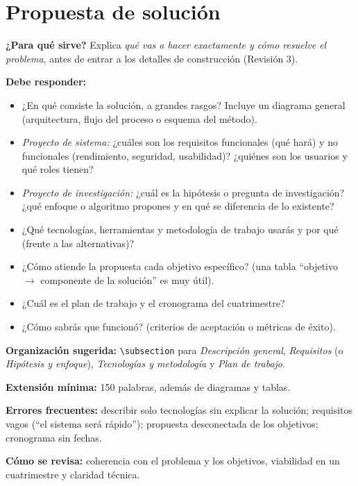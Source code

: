 
\section{Propuesta de solución} \label{sec:propuesta} %

\begin{guia}
\textbf{¿Para qué sirve?} Explica \emph{qué vas a hacer exactamente y cómo resuelve el problema}, antes de entrar a los
detalles de construcción (Revisión 3).

\textbf{Debe responder:}
\begin{itemize}[nosep,leftmargin=*]
  \item ¿En qué consiste la solución, a grandes rasgos? Incluye un diagrama general (arquitectura, flujo del proceso o
        esquema del método).
  \item \emph{Proyecto de sistema:} ¿cuáles son los requisitos funcionales (qué hará) y no funcionales (rendimiento,
        seguridad, usabilidad)? ¿quiénes son los usuarios y qué roles tienen?
  \item \emph{Proyecto de investigación:} ¿cuál es la hipótesis o pregunta de investigación? ¿qué enfoque o algoritmo
        propones y en qué se diferencia de lo existente?
  \item ¿Qué tecnologías, herramientas y metodología de trabajo usarás y por qué (frente a las alternativas)?
  \item ¿Cómo atiende la propuesta cada objetivo específico? (una tabla ``objetivo $\rightarrow$ componente de la solución''
        es muy útil).
  \item ¿Cuál es el plan de trabajo y el cronograma del cuatrimestre?
  \item ¿Cómo sabrás que funcionó? (criterios de aceptación o métricas de éxito).
\end{itemize}

\textbf{Organización sugerida:} \verb|\subsection| para \emph{Descripción general}, \emph{Requisitos} (o \emph{Hipótesis y
enfoque}), \emph{Tecnologías y metodología} y \emph{Plan de trabajo}.

\textbf{Extensión mínima:} 150 palabras, además de diagramas y tablas.

\textbf{Errores frecuentes:} describir solo tecnologías sin explicar la solución; requisitos vagos (``el sistema será
rápido''); propuesta desconectada de los objetivos; cronograma sin fechas.

\textbf{Cómo se revisa:} coherencia con el problema y los objetivos, viabilidad en un cuatrimestre y claridad técnica.
\end{guia}

